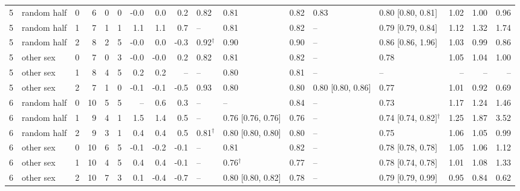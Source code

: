 \begin{table}[h]
\begin{tabular}{rlrr rr rrr lllll rrr}
5 & random half & 0 & 6 & 0 & 0 & -0.0 & 0.0 & 0.2 & 0.82 & 0.81 & 0.82 & 0.83 & 0.80 [0.80, 0.81] & 1.02 & 1.00 & 0.96 \\
5 & random half & 1 & 7 & 1 & 1 & 1.1 & 1.1 & 0.7 & -- & 0.81 & 0.82 & -- & 0.79 [0.79, 0.84] & 1.12 & 1.32 & 1.74 \\
5 & random half & 2 & 8 & 2 & 5 & -0.0 & 0.0 & -0.3 & 0.92$^\dagger$ & 0.90 & 0.90 & -- & 0.86 [0.86, 1.96] & 1.03 & 0.99 & 0.86 \\
5 & other sex & 0 & 7 & 0 & 3 & -0.0 & -0.0 & 0.2 & 0.82 & 0.81 & 0.82 & -- & 0.78 & 1.05 & 1.04 & 1.00 \\
5 & other sex & 1 & 8 & 4 & 5 & 0.2 & 0.2 & -- & -- & 0.80 & 0.81 & -- & -- & -- & -- & -- \\
5 & other sex & 2 & 7 & 1 & 0 & -0.1 & -0.1 & -0.5 & 0.93 & 0.80 & 0.80 & 0.80 [0.80, 0.86] & 0.77 & 1.01 & 0.92 & 0.69 \\
6 & random half & 0 & 10 & 5 & 5 & -- & 0.6 & 0.3 & -- & -- & 0.84 & -- & 0.73 & 1.17 & 1.24 & 1.46 \\
6 & random half & 1 & 9 & 4 & 1 & 1.5 & 1.4 & 0.5 & -- & 0.76 [0.76, 0.76] & 0.76 & -- & 0.74 [0.74, 0.82]$^\dagger$ & 1.25 & 1.87 & 3.52 \\
6 & random half & 2 & 9 & 3 & 1 & 0.4 & 0.4 & 0.5 & 0.81$^\dagger$ & 0.80 [0.80, 0.80] & 0.80 & -- & 0.75 & 1.06 & 1.05 & 0.99 \\
6 & other sex & 0 & 10 & 6 & 5 & -0.1 & -0.2 & -0.1 & -- & 0.81 & 0.82 & -- & 0.78 [0.78, 0.78] & 1.05 & 1.06 & 1.12 \\
6 & other sex & 1 & 10 & 4 & 5 & 0.4 & 0.4 & -0.1 & -- & 0.76$^\dagger$ & 0.77 & -- & 0.78 [0.74, 0.78] & 1.01 & 1.08 & 1.33 \\
6 & other sex & 2 & 10 & 7 & 3 & 0.1 & -0.4 & -0.7 & -- & 0.80 [0.80, 0.82] & 0.78 & -- & 0.79 [0.79, 0.99] & 0.95 & 0.84 & 0.62 \\
\bottomrule
\end{tabular}
\end{table}
